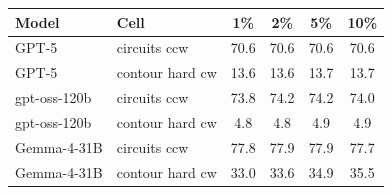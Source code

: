 \begin{tabular}{llcccc}
\toprule
Model & Cell & 1\% & 2\% & 5\% & 10\% \\
\midrule
GPT-5 & circuits ccw & 70.6 & 70.6 & 70.6 & 70.6 \\
GPT-5 & contour hard cw & 13.6 & 13.6 & 13.7 & 13.7 \\
gpt-oss-120b & circuits ccw & 73.8 & 74.2 & 74.2 & 74.0 \\
gpt-oss-120b & contour hard cw & 4.8 & 4.8 & 4.9 & 4.9 \\
Gemma-4-31B & circuits ccw & 77.8 & 77.9 & 77.9 & 77.7 \\
Gemma-4-31B & contour hard cw & 33.0 & 33.6 & 34.9 & 35.5 \\
\bottomrule
\end{tabular}
